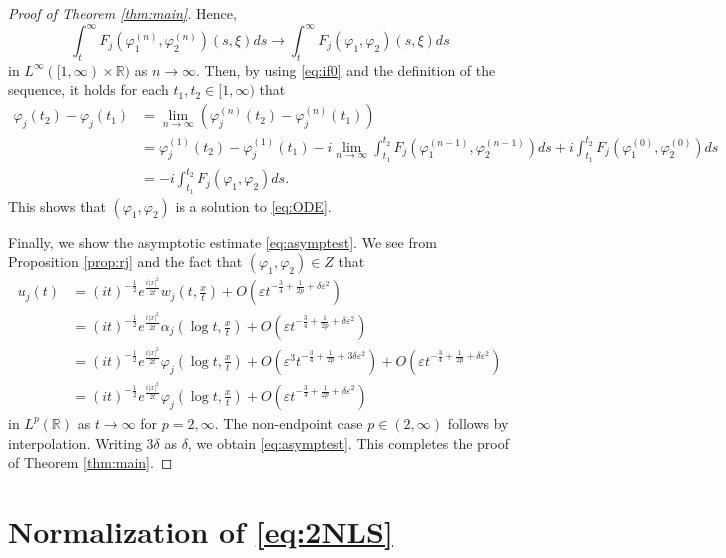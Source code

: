 \documentclass[11pt,a4paper,twosides]{amsart}
\theoremstyle{plain}
\theoremstyle{remark}
\numberwithin{equation}{section}
\newcommand{\R}{\mathbb{R}}
\theoremstyle{definition}
\newcommand{\1}{{\bf 1}_{\{|x| < |t|\}}}
\renewcommand{\phi}{\varphi}
\renewcommand{\epsilon}{\varepsilon}
\begin{document}
\begin{proof}[Proof of Theorem \ref{thm:main}]
  Hence,
  \begin{equation*}
    \int_t^\infty F_j(\phi_1^{(n)}, \phi_2^{(n)})(s,\xi) ds \to \int_t^\infty F_j(\phi_1, \phi_2)(s,\xi)ds
  \end{equation*}
  in $L^\infty([1,\infty)\times \R)$ as $n \to \infty$. Then, by using \eqref{eq:if0} and the definition of
  the sequence, it holds for each $t_1, t_2 \in [1, \infty)$ that
  \begin{align*}
    \phi_j(t_2) - \phi_j(t_1)
     & = \lim_{n \to \infty}(\phi_j^{(n)}(t_2) - \phi_j^{(n)}(t_1)) \\
     & = \phi_j^{(1)}(t_2) - \phi_j^{(1)}(t_1)
    - i\lim_{n \to \infty}\int_{t_1}^{t_2} F_j(\phi_1^{(n-1)}, \phi_2^{(n-1)})ds
    + i\int_{t_1}^{t_2} F_j(\phi_1^{(0)}, \phi_2^{(0)})ds           \\
     & = - i \int_{t_1}^{t_2} F_j(\phi_1, \phi_2)ds.
  \end{align*}
  This shows that $(\phi_1, \phi_2)$ is a solution to \eqref{eq:ODE}.

  Finally, we show the asymptotic estimate \eqref{eq:asymptest}.
  We see from Proposition \ref{prop:rj} and the fact that $(\phi_1, \phi_2) \in Z$ that
  \begin{align*}
    u_j(t) & = (it)^{-\frac12}e^{\frac{i|x|^2}{2t}}w_j(t, \tfrac{x}{t})
    + O(\epsilon t^{-\frac34 +\frac{1}{2p}+\delta\epsilon^2})                              \\
           & = (it)^{-\frac12}e^{\frac{i|x|^2}{2t}}\alpha_j(\log t, \tfrac{x}{t})
    + O(\epsilon t^{-\frac34+\frac{1}{2p}+\delta\epsilon^2})                               \\
           & = (it)^{-\frac12}e^{\frac{i|x|^2}{2t}}\phi_j(\log t, \tfrac{x}{t})
    + O(\epsilon^3t^{-\frac34+\frac{1}{2p}+3\delta\epsilon^2})
    + O(\epsilon t^{-\frac34+\frac{1}{2p}+\delta\epsilon^2})                               \\
           & = (it)^{-\frac12}e^{\frac{i|x|^2}{2t}}\phi_j(\log t, \tfrac{x}{t})
    + O(\epsilon t^{-\frac34+\frac{1}{2p}+\delta\epsilon^2})
  \end{align*}
  in $L^p(\R)$ as $t \to \infty$ for $p = 2, \infty$. The non-endpoint case $p \in (2,\infty)$
  follows by interpolation. Writing $3\delta$ as $\delta$, we obtain \eqref{eq:asymptest}. 
  This completes the proof of Theorem \ref{thm:main}. 
\end{proof}

\section{Normalization of \eqref{eq:2NLS}}
\end{document}
